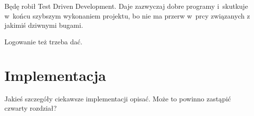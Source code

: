Będę robił Test Driven Development. Daje zazwyczaj dobre programy i~skutkuje w~końcu szybszym wykonaniem projektu, bo nie ma przerw w~prcy związanych z jakimiś dziwnymi bugami.

Logowanie też trzeba dać.

\section{Implementacja}
Jakieś szczegóły ciekawsze implementacji opisać. Może to powinno zastąpić czwarty rozdział?

%
%
%
%
